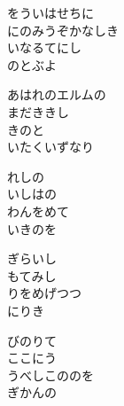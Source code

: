 \documentclass[10pt,b5j]{tarticle} %
\begin{document}
\vspace{1.5em} %
\newcommand{\linespace}{0.5em} %
\newcommand{\blocksize}{0.5\hsize} %
\begin{enumerate} %
    \begin{minipage}[c]{\blocksize}
    
        \vspace{\linespace}
        \item
        をういはせちに\\
        にのみうぞかなしき\\
        いなるてにし\\
        のとぶよ
        
        \vspace{\linespace}
        \item
        あはれのエルムの\\
        まだききし\\
        きのと\\
        いたくいずなり
        
        \vspace{\linespace}
        \item
        れしの\\
        いしはの\\
        わんをめて\\
        いきのを
        
        \vspace{\linespace}
        \item
        ぎらいし\\
        もてみし\\
        りをめげつつ\\
        にりき
        
        \vspace{\linespace}
        \item
        びのりて\\
        ここにう\\
        うべしこののを\\
        ぎかんの
        

\end{minipage}
\end{enumerate}
\end{document}
